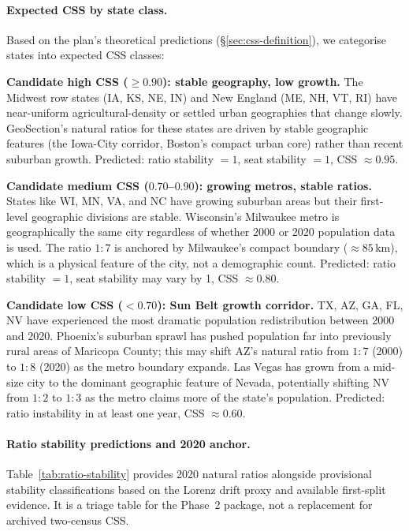 \paragraph{Expected CSS by state class.}
Based on the plan's theoretical predictions (\S\ref{sec:css-definition}),
we categorise states into expected CSS classes:

\textbf{Candidate high CSS ($\geq 0.90$): stable geography, low growth.}
The Midwest row states (IA, KS, NE, IN) and New England (ME, NH, VT, RI)
have near-uniform agricultural-density or settled urban geographies that
change slowly.
GeoSection's natural ratios for these states are driven by stable geographic
features (the Iowa-City corridor, Boston's compact urban core) rather than
recent suburban growth.
Predicted: ratio stability $= 1$, seat stability $= 1$,
CSS $\approx 0.95$.

\textbf{Candidate medium CSS ($0.70$--$0.90$): growing metros, stable ratios.}
States like WI, MN, VA, and NC have growing suburban areas but their
first-level geographic divisions are stable.
Wisconsin's Milwaukee metro is geographically the same city regardless of
whether 2000 or 2020 population data is used.
The ratio $1:7$ is anchored by Milwaukee's compact boundary ($\approx 85$\,km),
which is a physical feature of the city, not a demographic count.
Predicted: ratio stability $= 1$, seat stability may vary by 1,
CSS $\approx 0.80$.

\textbf{Candidate low CSS ($< 0.70$): Sun Belt growth corridor.}
TX, AZ, GA, FL, NV have experienced the most dramatic population
redistribution between 2000 and 2020.
Phoenix's suburban sprawl has pushed population far into previously rural
areas of Maricopa County; this may shift AZ's natural ratio from $1:7$ (2000)
to $1:8$ (2020) as the metro boundary expands.
Las Vegas has grown from a mid-size city to the dominant geographic feature
of Nevada, potentially shifting NV from $1:2$ to $1:3$ as the metro claims
more of the state's population.
Predicted: ratio instability in at least one year, CSS $\approx 0.60$.

\paragraph{Ratio stability predictions and 2020 anchor.}
Table~\ref{tab:ratio-stability} provides 2020 natural ratios alongside
provisional stability classifications based on the Lorenz drift proxy and
available first-split evidence.  It is a triage table for the Phase~2 package,
not a replacement for archived two-census CSS.

